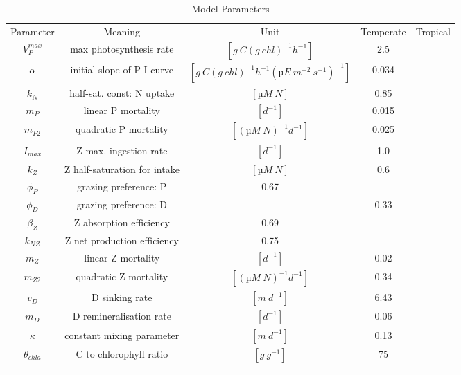 \documentclass[journal abbreviation, manuscript]{copernicus}
\begin{document}
\begin{table*}[t]
\caption{Model Parameters}
\begin{tabular}{c c c c c}
Parameter & Meaning & Unit & Temperate & Tropical \\
\tophline
$V^{max}_P$ & max photosynthesis rate & $[g \ C (g \ chl)^{−1} h^{−1}]$ & 2.5  &  \\
$\alpha$ & initial slope of P-I curve & $[g \ C (g \ chl)^{−1} h^{−1} (µE \ m^{-2} \ s^{-1})^{-1}]$ & 0.034 & \\
$k_N$ & half-sat. const: N uptake & $[µM \ N]$ & 0.85 & \\
$m_P$ & linear P mortality & $[d^{−1}]$ & 0.015 & \\
$m_{P2}$ & quadratic P mortality & $[(µM \ N)^{-1} d^{−1}]$ & 0.025 & \\
$I_{max}$ & Z max. ingestion rate & $[d^{−1}]$ & 1.0 & \\
$k_Z$ & Z half-saturation for intake & $[µM \ N]$ & 0.6 & \\
$\phi_P$ & grazing preference: P & 0.67 & & \\
$\phi_D$ & grazing preference: D & & 0.33 & \\
$\beta_Z$ & Z absorption efficiency & 0.69 & & \\
$k_{NZ}$ & Z net production efficiency & 0.75 & & \\
$m_Z$ & linear Z mortality  & $[d^{−1}]$ & 0.02 & \\
$m_{Z2}$ & quadratic Z mortality & $[(µM \ N)^{-1} d^{−1}]$ & 0.34 & \\
$v_D$ & D sinking rate & $[m \ d^{−1}]$ & 6.43 & \\
$m_D$ & D remineralisation rate & $[d^{−1}]$ & 0.06 & \\
$\kappa$ & constant mixing parameter & $[m \ d^{−1}]$ & 0.13 & \\
$\theta_{chla}$ & C to chlorophyll ratio & $[g \ g^{-1}]$ & 75 & \\
\middlehline

\bottomhline
\end{tabular}
\label{table:params}
\end{table*}
%
\end{document}
